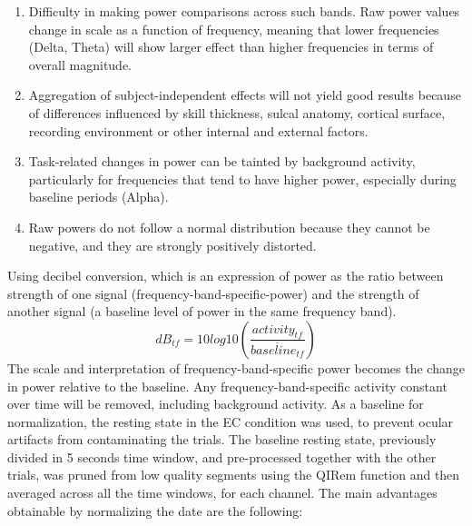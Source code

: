 \begin{enumerate}
\item 	Difficulty in making power comparisons across such bands. Raw power values change in scale as a function of frequency, meaning that lower frequencies (Delta, Theta) will show larger effect than higher frequencies in terms of overall magnitude.
\item 	Aggregation of subject-independent effects will not yield good results because of differences influenced by skill thickness, sulcal anatomy, cortical surface, recording environment or other internal and external factors.
\item 	Task-related changes in power can be tainted by background activity, particularly for frequencies that tend to have higher power, especially during baseline periods (Alpha).
\item 	Raw powers do not follow a normal distribution because they cannot be negative, and they are strongly positively distorted.
\end{enumerate}
Using decibel conversion, which is an expression of power as the ratio between strength of one signal (frequency-band-specific-power) and the strength of another signal (a baseline level of power in the same frequency band).
\[dB_{tf} = 10log10 \left(\frac{activity_{tf}}{\overline{baseline_{tf}}} \right)\]
The scale and interpretation of frequency-band-specific power becomes the change in power relative to the baseline. Any frequency-band-specific activity constant over time will be removed, including background activity. As a baseline for normalization, the resting state in the \ac{EC} condition was used, to prevent ocular artifacts from contaminating the trials. The baseline resting state, previously divided in 5 seconds time window, and pre-processed together with the other trials, was pruned from low quality segments using the \ac{QIRem} function and then averaged across all the time windows, for each channel. The main advantages obtainable by normalizing the date are the following: 

